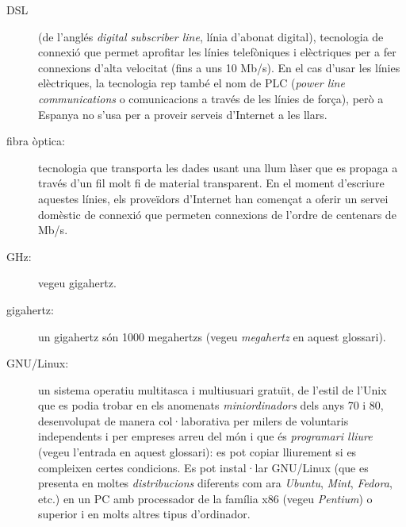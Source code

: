 \begin{description}
  
\item[DSL] (de l'anglés \emph{digital subscriber line}, línia d'abonat
  digital), tecnologia de connexió que permet aprofitar les línies
  telefòniques i elèctriques per a fer connexions d'alta velocitat
  (fins a uns 10 Mb/s). En el cas d'usar les línies elèctriques, la
  tecnologia rep també el nom de PLC (\emph{power line communications}
  o comunicacions a través de les línies de força), però a Espanya no
  s'usa per a proveir serveis d'Internet a les llars.

\item[fibra òptica:] tecnologia que transporta les dades usant una
  llum làser que es propaga a través d'un fil molt fi de material
  transparent. En el moment d'escriure aquestes línies, els proveïdors
  d'Internet han començat a oferir un servei domèstic de connexió que
  permeten connexions de l'ordre de centenars de Mb/s.

\item[GHz:] vegeu gigahertz.

\item[gigahertz:] un gigahertz són 1000 megahertzs (vegeu
  \emph{megahertz} en aquest glossari).
  
\item[GNU/Linux:] un sistema operatiu multitasca i multiusuari
  gratu\"{\i}t, de l'estil de l'Unix que es podia trobar en els
  anomenats \emph{miniordinadors} dels anys 70 i 80, desenvolupat de
  manera col·laborativa per milers de voluntaris independents i per
  empreses arreu del món i que és \emph{programari lliure} (vegeu
  l'entrada en aquest glossari): es pot copiar lliurement si es
  compleixen certes condicions. Es pot instal·lar GNU/Linux (que
  es presenta en moltes \emph{distribucions} diferents com ara
  \emph{Ubuntu}, \emph{Mint}, \emph{Fedora}, etc.) en un PC amb
  processador de la família x86 (vegeu \emph{Pentium}) o superior i en
  molts altres tipus d'ordinador.
  

\end{description}
